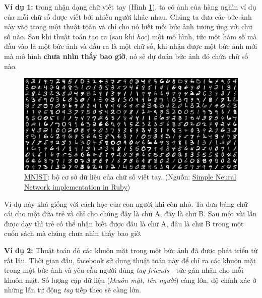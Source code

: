 \textbf{Ví dụ 1:} trong nhận dạng chữ viết tay (Hình \ref{fig:categories_mnist}), ta có ảnh của hàng nghìn ví dụ của mỗi chữ số được viết bởi nhiều người khác nhau. Chúng ta đưa các bức ảnh này vào trong một thuật toán và chỉ cho nó biết mỗi bức ảnh tương ứng với chữ số nào. Sau khi thuật toán tạo ra (sau khi \textit{học}) một mô hình, tức một hàm số mà đầu vào là một bức ảnh và đầu ra là một chữ số, khi nhận được một bức ảnh mới mà mô hình \textbf{chưa nhìn thấy bao giờ}, nó sẽ dự đoán bức ảnh đó chứa chữ số nào. 
 
 
 \begin{figure}
   \centering
   \includegraphics[width = .7\textwidth]{../categories/mnist.png}
   \caption{\href{http://yann.lecun.com/exdb/mnist/}{MNIST}: bộ cơ sở dữ liệu của chữ số viết tay. (Nguồn: \href{http://www.rubylab.io/2015/03/18/simple-neural-network-implenentation-in-ruby/}{Simple Neural Network implementation in Ruby})}
   \label{fig:categories_mnist}
 \end{figure}
 
Ví dụ này khá giống với cách học của con người khi còn nhỏ. Ta đưa bảng chữ cái cho một đứa trẻ và chỉ cho chúng đây là chữ A, đây là chữ B. Sau một vài lần được dạy thì trẻ có thể nhận biết được đâu là chữ A, đâu là chữ B trong một cuốn sách mà chúng chưa nhìn thấy bao giờ.  
 
\textbf{Ví dụ 2:} Thuật toán dò các khuôn mặt trong một bức ảnh đã được phát triển từ rất lâu. Thời gian đầu, facebook sử dụng thuật toán này để chỉ ra các khuôn mặt trong một bức ảnh và yêu cầu người dùng \textit{tag friends} - tức gán nhãn cho mỗi khuôn mặt. Số lượng cặp dữ liệu (\textit{khuôn mặt, tên người}) càng lớn, độ chính xác ở những lần tự động \textit{tag} tiếp theo sẽ càng lớn. 
 
